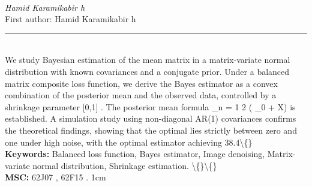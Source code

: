 \documentclass[10pt,twoside]{article}
\begin{document}
\noindent\begin{minipage}[t][\textheight]{\textwidth}
\\[0.35em]
{\itshape Hamid Karamikabir h}\\[0.2em]
{\footnotesize First author: Hamid Karamikabir h}\\[0.45em]
\noindent\rule{\textwidth}{0.3pt}\\[0.4em]
{\footnotesize  We study Bayesian estimation of the mean matrix in a matrix-variate normal distribution with known covariances and a conjugate prior. Under a balanced matrix composite loss function, we derive the Bayes estimator as a convex combination of the posterior mean and the observed data, controlled by a shrinkage parameter [0,1] . The posterior mean formula \_n = 1 2 ( \_0 + X) is established. A simulation study using non-diagonal AR(1) covariances confirms the theoretical findings, showing that the optimal lies strictly between zero and one under high noise, with the optimal estimator achieving 38.4\textbackslash\{\}}\\[0.4em]
{\footnotesize\bfseries Keywords:} {\footnotesize Balanced loss function, Bayes estimator, Image denoising, Matrix-variate normal distribution, Shrinkage estimation. \textbackslash\{\}\textbackslash\{\}}\\[0.15em]
{\footnotesize\bfseries MSC:} {\footnotesize 62J07 , 62F15 . 1cm}\\
\vfill
\end{minipage}
\newpage
\end{document}
